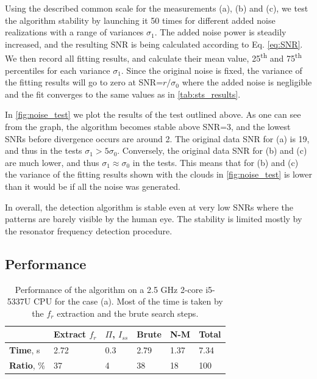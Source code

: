 \documentclass[%
 aip,
 amsmath,amssymb,
 reprint,%
]{revtex4-1}
\begin{document}
Using the described common scale for the measurements (a), (b) and (c), we test the algorithm stability by launching it 50 times for different added noise realizations with a range of variances $\sigma_1$. The added noise power is steadily increased, and the resulting SNR is being calculated according to Eq. \eqref{eq:SNR}. We then record all fitting results, and calculate their mean value, 25\textsuperscript{th} and 75\textsuperscript{th} percentiles for each variance $\sigma_1$.  Since the original noise is fixed, the variance of the fitting results will go to zero at SNR=$ r/\sigma_0 $ where the added noise is negligible and the fit converges to the same values as in \autoref{tab:sts_results}. 

In \autoref{fig:noise_test} we plot the results of the test outlined above. As one can see from the graph, the algorithm becomes stable above SNR=3, and the lowest SNRs before divergence occurs are around 2. The original data SNR for (a) is 19, and thus in the tests $\sigma_1 > 5\sigma_0$. Conversely, the original data SNR for (b) and (c) are much lower, and thus $\sigma_1 \approx \sigma_0$ in the tests. This means that for (b) and (c) the variance of the fitting results shown with the clouds in \autoref{fig:noise_test} is lower than it would be if all the noise was generated.

In overall, the detection algorithm is stable even at very low SNRs where the patterns are barely visible by the human eye. The stability is limited mostly by the resonator frequency detection procedure.


\subsection{Performance}


\begin{table}[b]
	\begin{ruledtabular}
		\begin{tabular}{llllll}
			&Extract $f_r$& $\Pi$, $I_{ss}$ & Brute &N-M &
			\textbf{Total}\\\hline
			\textbf{Time}, s& 2.72& 0.3&2.79&1.37&7.34\\
			\textbf{Ratio}, \% & 37 &4 &38 &18 &100
		\end{tabular}
	\end{ruledtabular}
	\caption{Performance of the algorithm on a 2.5 GHz 2-core i5-5337U CPU for the case (a). Most of the time is taken by the $f_r$ extraction and the brute search steps.}
	\label{tab:performance}
\end{table}
\end{document}
